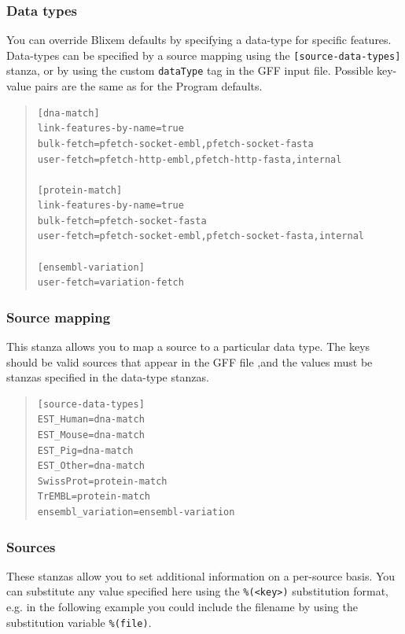 \documentclass[letterpaper]{article}
\newcommand\textstyleSourceText[1]{\texttt{#1}}
\begin{document}
{\color[rgb]{0.30980393,0.5058824,0.7411765}\subsubsection[Data types ]{Data types }}
\hypertarget{RefHeading37731724351149}{}{
You can override Blixem defaults by specifying a data-type for specific
features. Data-types can be specified by a source mapping using the
\texttt{[source-data-types]} stanza, or by using the custom
\textstyleSourceText{dataType} tag in the GFF input file. Possible
key-value pairs are the same as for the Program defaults. }

\bigskip

\begin{quote}
\begin{verbatim}
[dna-match]
link-features-by-name=true
bulk-fetch=pfetch-socket-embl,pfetch-socket-fasta
user-fetch=pfetch-http-embl,pfetch-http-fasta,internal

[protein-match]
link-features-by-name=true
bulk-fetch=pfetch-socket-fasta
user-fetch=pfetch-socket-embl,pfetch-socket-fasta,internal

[ensembl-variation]
user-fetch=variation-fetch
\end{verbatim}
\end{quote}

{\color[rgb]{0.30980393,0.5058824,0.7411765}\subsubsection[Source mapping ]{Source mapping }}
\hypertarget{RefHeading37751724351149}{}{
This stanza allows you to map a source to a particular data type. The
keys should be valid sources that appear in the GFF file ,and the
values must be stanzas specified in the data-type stanzas. }

\bigskip

\begin{quote}
\begin{verbatim}
[source-data-types]
EST_Human=dna-match
EST_Mouse=dna-match
EST_Pig=dna-match
EST_Other=dna-match
SwissProt=protein-match
TrEMBL=protein-match
ensembl_variation=ensembl-variation
\end{verbatim}
\end{quote}

{\color[rgb]{0.30980393,0.5058824,0.7411765}\subsubsection[Sources ]{Sources }}
\hypertarget{RefHeading37771724351149}{}
These stanzas allow you to set additional information on a per-source basis. You can substitute any value specified here using the \texttt{\%(<key>)} substitution format, e.g. in the following example you could include the filename by using the substitution variable \texttt{\%(file)}.
\end{document}
